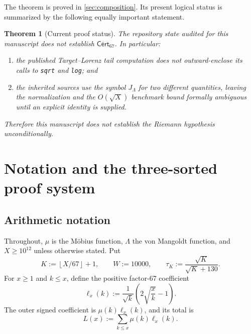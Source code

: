 \documentclass[11pt]{article}
\newtheorem{theorem}{Theorem}[section]
\theoremstyle{definition}
\theoremstyle{remark}
\newcommand{\1}{\mathbf 1}
\newcommand{\Cert}{\mathsf{Cert}_{67}}
\newcommand{\floor}[1]{\left\lfloor #1\right\rfloor}
\begin{document}
The theorem is proved in \cref{sec:composition}.  Its present logical status is summarized by the following equally important statement.

\begin{theorem}[Current proof status]\label{thm:status}
The repository state audited for this manuscript does not establish \(\Cert\).  In particular:
\begin{enumerate}
\item the published Target--Lorenz tail computation does not outward-enclose its calls to \texttt{sqrt} and \texttt{log}; and
\item the inherited sources use the symbol \(J_\Lambda\) for two different quantities, leaving the normalization and the \(O(\sqrt X)\) benchmark bound formally ambiguous until an explicit identity is supplied.
\end{enumerate}
Therefore this manuscript does not establish the Riemann hypothesis unconditionally.
\end{theorem}

\section{Notation and the three-sorted proof system}\label{sec:framework}

\subsection{Arithmetic notation}

Throughout, \(\mu\) is the M\"obius function, \(\Lambda\) the von Mangoldt function, and \(X\ge 10^{12}\) unless otherwise stated.  Put
\begin{equation}\label{eq:K-W}
K:=\floor{X/67}+1,\qquad W:=10000,
\qquad \tau_K:=\frac{\sqrt K}{\sqrt K+130}.
\end{equation}
For \(x\ge1\) and \(k\le x\), define the positive factor-67 coefficient
\begin{equation}\label{eq:ell}
\ell_x(k):=\frac1{\sqrt k}\left(2\sqrt{\frac xk}-1\right).
\end{equation}
The outer signed coefficient is \(\mu(k)\ell_x(k)\), and its total is
\begin{equation}\label{eq:Lx}
L(x):=\sum_{k\le x}\mu(k)\ell_x(k).
\end{equation}
\end{document}
